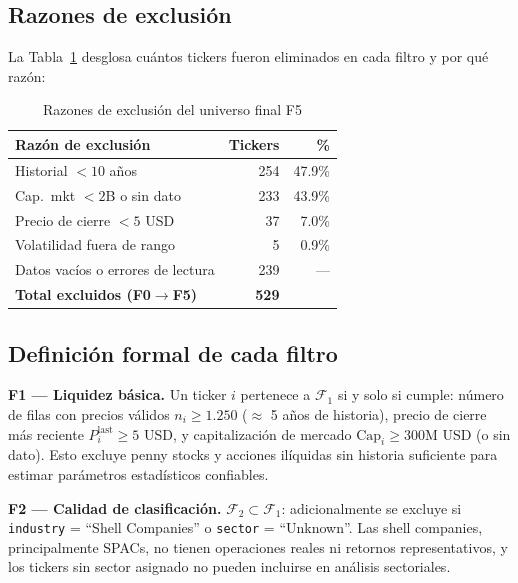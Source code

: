 \subsection*{Razones de exclusión}

La Tabla~\ref{tab:exclusion} desglosa cuántos tickers fueron eliminados
en cada filtro y por qué razón:

\begin{table}[H]
  \centering
  \caption{Razones de exclusión del universo final F5}
  \label{tab:exclusion}
  \begin{tabular}{lrr}
    \toprule
    \textbf{Razón de exclusión} & \textbf{Tickers} & \textbf{\%} \\
    \midrule
    Historial $< 10$ años             & 254 & 47.9\% \\
    Cap.\ mkt $< 2$B o sin dato       & 233 & 43.9\% \\
    Precio de cierre $< 5$ USD        &  37 &  7.0\% \\
    Volatilidad fuera de rango        &   5 &  0.9\% \\
    Datos vacíos o errores de lectura & 239 & ---    \\
    \midrule
    \textbf{Total excluidos (F0$\to$F5)} & \textbf{529} & \\
    \bottomrule
  \end{tabular}
\end{table}

\subsection*{Definición formal de cada filtro}

\textbf{F1 --- Liquidez básica.}
Un ticker $i$ pertenece a $\mathcal{F}_1$ si y solo si cumple:
número de filas con precios válidos $n_i \geq 1.250$ ($\approx$ 5 años de historia),
precio de cierre más reciente $P_i^{\text{last}} \geq 5$ USD, y
capitalización de mercado $\text{Cap}_i \geq 300$M USD (o sin dato).
Esto excluye penny stocks y acciones ilíquidas sin historia suficiente
para estimar parámetros estadísticos confiables.

\medskip

\textbf{F2 --- Calidad de clasificación.}
$\mathcal{F}_2 \subset \mathcal{F}_1$: adicionalmente se excluye si
\texttt{industry} = ``Shell Companies'' o \texttt{sector} = ``Unknown''.
Las shell companies, principalmente SPACs, no tienen operaciones reales
ni retornos representativos, y los tickers sin sector asignado no pueden
incluirse en análisis sectoriales.

